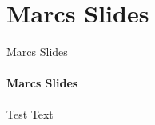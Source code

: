 \section{Marcs Slides}
    \begin{frame}[t]{Marcs Slides}\framesubtitle{Marcs Slides}
        Test Text
    \end{frame}